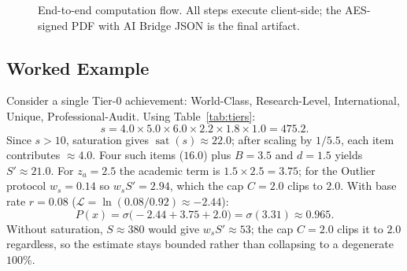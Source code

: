 \documentclass[conference]{IEEEtran}
\begin{document}
\begin{figure}[!t]
\centering
{}
\caption{End-to-end computation flow. All steps execute client-side; the AES-signed PDF with AI Bridge JSON is the final artifact.}
\label{fig:flow}
\end{figure}

\subsection{Worked Example}
Consider a single Tier-0 achievement: World-Class, Research-Level, International, Unique, Professional-Audit. Using Table~\ref{tab:tiers}:
\[
s = 4.0 \times 5.0 \times 6.0 \times 2.2 \times 1.8 \times 1.0 = 475.2.
\]
Since $s{>}10$, saturation gives $\operatorname{sat}(s)\approx 22.0$; after scaling by $1/5.5$, each item contributes $\approx 4.0$. Four such items ($16.0$) plus $B{=}3.5$ and $d{=}1.5$ yields $S'{\approx}21.0$. For $z_a{=}2.5$ the academic term is $1.5\times 2.5 = 3.75$; for the Outlier protocol $w_s{=}0.14$ so $w_s S' = 2.94$, which the cap $C{=}2.0$ clips to $2.0$. With base rate $r{=}0.08$ ($\mathcal{L} = \ln(0.08/0.92) \approx -2.44$):
\[
P(x) = \sigma\!\bigl(-2.44 + 3.75 + 2.0\bigr)
     = \sigma(3.31) \approx 0.965.
\]
Without saturation, $S\approx 380$ would give $w_s S' \approx 53$; the cap $C{=}2.0$ clips it to $2.0$ regardless, so the estimate stays bounded rather than collapsing to a degenerate $100\%$.
\end{document}

